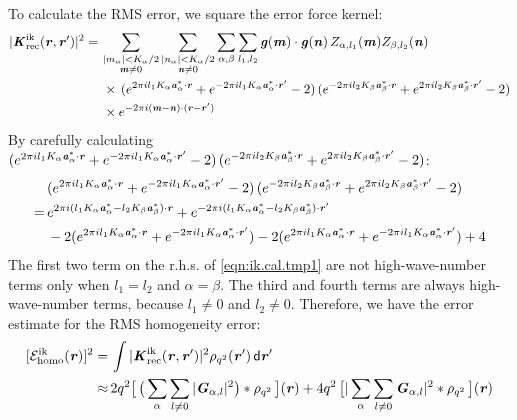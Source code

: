 \documentclass[journal=jacsat,manuscript=article]{achemso}
\renewcommand{\v}[1]{\textbf{\textit{#1}}}
\renewcommand{\d}[1]{\textsf{#1}}
\begin{document}
To calculate the RMS error, we square the error force kernel:
\begin{align}\nonumber
  \vert\v K^{\textrm{ik}}_{\textrm{rec}}(\v r,\v r')\vert^2
  =\,&
  \sum_{
    \begin{subarray}{c}
      \vert m_{\alpha}\vert < K_\alpha/2\\
      \v m\neq 0
    \end{subarray}}
  \sum_{
    \begin{subarray}{c}
      \vert n_{\alpha}\vert < K_\alpha/2\\
      \v n\neq 0
    \end{subarray}}
  \sum_{\alpha,\beta}
  \sum_{l_1,l_2}
  \v g(\v m)\cdot\v g(\v n)\,
  Z_{\alpha,l_1}(\v m)Z_{\beta,l_2}(\v n)
  \\\nonumber
  &\,
  \times
  \,(
  e^{2\pi i l_1 K_\alpha\v a^\ast_\alpha\cdot \v r} +
  e^{-2\pi i l_1 K_\alpha\v a^\ast_\alpha\cdot \v r'}
  - 2
  )
  \,(
  e^{-2\pi i l_2 K_\beta\v a^\ast_\beta\cdot \v r} +
  e^{2\pi i l_2 K_\beta\v a^\ast_\beta\cdot \v r'}
  - 2
  )\\
  &\,
  \times
  e^{-2\pi i(\v m-\v n)\cdot(\v r-\v r')}
\end{align}
By  carefully calculating
$  (
e^{2\pi i l_1 K_\alpha\v a^\ast_\alpha\cdot \v r} +
e^{-2\pi i l_1 K_\alpha\v a^\ast_\alpha\cdot \v r'}
- 2
)
\,(
e^{-2\pi i l_2 K_\beta\v a^\ast_\beta\cdot \v r} +
e^{2\pi i l_2 K_\beta\v a^\ast_\beta\cdot \v r'}
- 2
)$:
\begin{align}\nonumber
  &(
  e^{2\pi i l_1 K_\alpha\v a^\ast_\alpha\cdot \v r} +
  e^{-2\pi i l_1 K_\alpha\v a^\ast_\alpha\cdot \v r'}
  - 2
  )
  \,(
  e^{-2\pi i l_2 K_\beta\v a^\ast_\beta\cdot \v r} +
  e^{2\pi i l_2 K_\beta\v a^\ast_\beta\cdot \v r'}
  - 2
  ) \\ \nonumber
  = \,&
  e^{2\pi i(l_1K_\alpha\v a^\ast_\alpha - l_2K_\beta\v a^\ast_\beta)\cdot\v r} +
  e^{-2\pi i(l_1K_\alpha\v a^\ast_\alpha - l_2K_\beta\v a^\ast_\beta)\cdot\v r'} \\
  \label{eqn:ik.cal.tmp1}
  &-2(
  e^{2\pi i l_1 K_\alpha\v a^\ast_\alpha\cdot \v r} +
  e^{-2\pi i l_1 K_\alpha\v a^\ast_\alpha\cdot \v r'}
  ) 
  -2(
  e^{2\pi i l_1 K_\alpha\v a^\ast_\alpha\cdot \v r} +
  e^{-2\pi i l_1 K_\alpha\v a^\ast_\alpha\cdot \v r'}
  ) + 4
\end{align}
The first two term on the r.h.s. of \ref{eqn:ik.cal.tmp1}
are not high-wave-number terms only when $l_1 = l_2$ and $\alpha=\beta$.
The third and fourth terms are always high-wave-number terms,
because $l_1\neq 0$ and $l_2\neq 0$.
Therefore, we have the error estimate
for the RMS homogeneity error:
\begin{align}\nonumber
  [\mathcal E^{\textrm{ik}}_{\textrm{homo}}(\v r)]^2
  = \,&
  \int
  \vert\v K^{\textrm{ik}}_{\textrm{rec}}(\v r,\v r')\vert^2
  \rho_{q^2}(\v r')\,\d d\v r' \\
  \approx\,&  
  2q^2
  \big[\,
  \big(
  \sum_{\alpha} \sum_{l\neq 0}
  \vert \v G_{\alpha,l}\vert^2
  \big)
  \ast \rho_{q^2}
  \,\big] (\v r)
  +
  4q^2\,
  \big[
  \vert
  \sum_{\alpha} \sum_{l\neq 0}  
  \v G_{\alpha,l}
  \vert^2
  \ast \rho_{q^2}\,
  \big] (\v r) 
\end{align}
\end{document}
